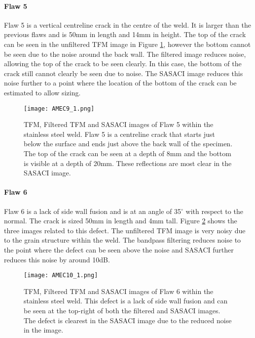 \clearpage

\paragraph{Flaw 5}

Flaw 5 is a vertical centreline crack in the centre of the weld. It is larger than the previous flaws and is 50mm in length and 14mm in height. The top of the crack can be seen in the unfiltered TFM image in Figure \ref{fig:AMEC_flaw5}, however the bottom cannot be seen due to the noise around the back wall. The filtered image reduces noise, allowing the top of the crack to be seen clearly. In this case, the bottom of the crack still cannot clearly be seen due to noise. The SASACI image reduces this noise further to a point where the location of the bottom of the crack can be estimated to allow sizing.

\vspace{20mm}

\begin{figure}[h!]
\centering
		\texttt{[image: AMEC9\_1.png]}
		\caption{TFM, Filtered TFM and SASACI images of Flaw 5 within the stainless steel weld. Flaw 5 is a centreline crack that starts just below the surface and ends just above the back wall of the specimen. The top of the crack can be seen at a depth of 8mm and the bottom is visible at a depth of 20mm. These reflections are most clear in the SASACI image.}
		\label{fig:AMEC_flaw5}
\end{figure}

\clearpage

\paragraph{Flaw 6}

Flaw 6 is a lack of side wall fusion and is at an angle of 35$^{\circ}$ with respect to the normal. The crack is sized 50mm in length and 4mm tall. Figure \ref{fig:AMEC_flaw6} shows the three images related to this defect. The unfiltered TFM image is very noisy due to the grain structure within the weld. The bandpass filtering reduces noise to the point where the defect can be seen above the noise and SASACI further reduces this noise by around 10dB. 

\vspace{20mm}

\begin{figure}[h!]
\centering
		\texttt{[image: AMEC10\_1.png]}
		\caption{TFM, Filtered TFM and SASACI images of Flaw 6 within the stainless steel weld. This defect is a lack of side wall fusion and can be seen at the top-right of both the filtered and SASACI images. The defect is clearest in the SASACI image due to the reduced noise in the image.}
		\label{fig:AMEC_flaw6}
\end{figure}

